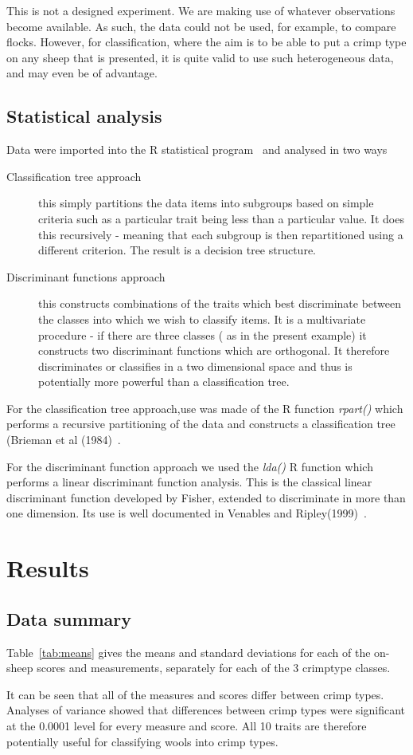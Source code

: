 \documentclass[titlepage]{article}  %
\begin{document}
This is not a designed experiment. We are making use of whatever observations become available. As such, the data could not be used, for example, to compare flocks. However, for classification, where the aim is to be able to put a crimp type on any sheep that is presented, it is quite valid to use such heterogeneous data, and may even be of advantage.



\subsection{Statistical analysis}

 Data were imported into the R statistical program~\cite{rprog:13} and analysed in two ways
\begin{description}
\item[Classification tree approach]  this simply partitions the data items into subgroups based on simple criteria such as a particular trait being less than a particular value. It does this recursively - meaning that each subgroup is then repartitioned using a different criterion. The result is a decision tree structure.
\item[Discriminant functions approach] this constructs combinations of the traits which best discriminate between the classes into which we wish to classify items.  It is a multivariate procedure - if there are three classes ( as in the present example) it constructs two discriminant functions which are orthogonal. It therefore discriminates or classifies in a two dimensional space and thus is potentially more powerful than a classification tree.
\end{description}

 For the classification tree approach,use was  made of the R function {\em rpart()} which performs a recursive partitioning of the data and constructs a classification tree (Brieman et al (1984)~\cite{brei:84}.

 For the discriminant function approach we used the {\em lda()} R function which performs a linear discriminant function analysis. This is the classical linear discriminant function developed by Fisher, extended to discriminate in more than one dimension. Its use is well documented in Venables and Ripley(1999)~\cite{vena:99}.


\section{Results}
\subsection{Data summary}
Table~\ref{tab:means} gives the means and standard deviations for each of the on-sheep scores and measurements, separately for each of the 3 crimptype classes.

It can be seen that all of the measures and scores differ between crimp types. Analyses of variance showed that differences between crimp types were significant at the 0.0001 level for every measure and score. All 10 traits are therefore potentially useful for classifying wools into crimp types. 
\end{document}
